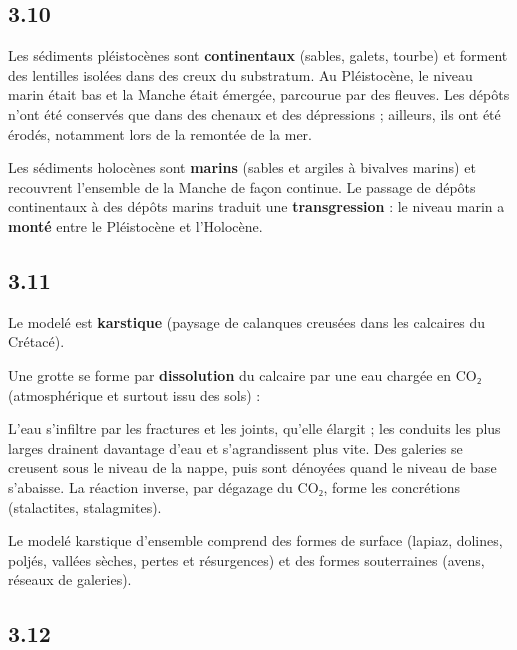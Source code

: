 \documentclass[11pt,a4paper]{article}
\newcommand{\equationajustee}[1]{%
  \sbox{\boiteequation}{$\displaystyle #1$}%
  \ifdim\wd\boiteequation>\linewidth
    \[\resizebox{\linewidth}{!}{\usebox{\boiteequation}}\]%
  \else
    \[#1\]%
  \fi}
\begin{document}
\hypertarget{section-37}{%
\subsection{3.10}\label{section-37}}

Les sédiments pléistocènes sont \textbf{continentaux} (sables, galets, tourbe) et forment des lentilles isolées dans des creux du substratum. Au Pléistocène, le niveau marin était bas et la Manche était émergée, parcourue par des fleuves. Les dépôts n'ont été conservés que dans des chenaux et des dépressions ; ailleurs, ils ont été érodés, notamment lors de la remontée de la mer.

Les sédiments holocènes sont \textbf{marins} (sables et argiles à bivalves marins) et recouvrent l'ensemble de la Manche de façon continue. Le passage de dépôts continentaux à des dépôts marins traduit une \textbf{transgression} : le niveau marin a \textbf{monté} entre le Pléistocène et l'Holocène.

\hypertarget{section-38}{%
\subsection{3.11}\label{section-38}}

Le modelé est \textbf{karstique} (paysage de calanques creusées dans les calcaires du Crétacé).

Une grotte se forme par \textbf{dissolution} du calcaire par une eau chargée en CO₂ (atmosphérique et surtout issu des sols) :

\equationajustee{\mathrm{CaCO_3 + CO_2 + H_2O \rightleftharpoons Ca^{2+} + 2\,HCO_3^-}}

L'eau s'infiltre par les fractures et les joints, qu'elle élargit ; les conduits les plus larges drainent davantage d'eau et s'agrandissent plus vite. Des galeries se creusent sous le niveau de la nappe, puis sont dénoyées quand le niveau de base s'abaisse. La réaction inverse, par dégazage du CO₂, forme les concrétions (stalactites, stalagmites).

Le modelé karstique d'ensemble comprend des formes de surface (lapiaz, dolines, poljés, vallées sèches, pertes et résurgences) et des formes souterraines (avens, réseaux de galeries).

\hypertarget{section-39}{%
\subsection{3.12}\label{section-39}}
\end{document}
